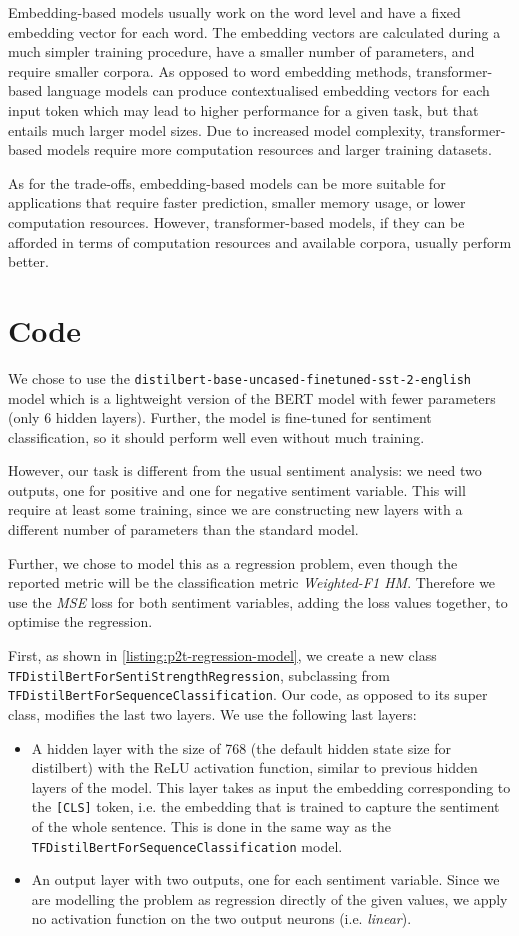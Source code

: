 Embedding-based models usually work on the word level and have a fixed embedding vector for each word. The embedding vectors are calculated during a much simpler training procedure, have a smaller number of parameters, and require smaller corpora.
As opposed to word embedding methods, transformer-based language models can produce contextualised embedding vectors for each input token which may lead to higher performance for a given task, but that entails much larger model sizes. Due to increased model complexity, transformer-based models require more computation resources and larger training datasets.

As for the trade-offs, embedding-based models can be more suitable for applications that require faster prediction, smaller memory usage, or lower computation resources. However, transformer-based models, if they can be afforded in terms of computation resources and available corpora, usually perform better.

\section{Code}

We chose to use the \texttt{distilbert-base-uncased-finetuned-sst-2-english} model which is a lightweight version of the BERT model with fewer parameters (only 6 hidden layers). Further, the model is fine-tuned for sentiment classification, so it should perform well even without much training.

However, our task is different from the usual sentiment analysis: we need two outputs, one for positive and one for negative sentiment variable. This will require at least some training, since we are constructing new layers with a different number of parameters than the standard model.

Further, we chose to model this as a regression problem, even though the reported metric will be the classification metric \textit{Weighted-F1 HM}. Therefore we use the \textit{MSE} loss for both sentiment variables, adding the loss values together, to optimise the regression.

First, as shown in \cref{listing:p2t-regression-model}, we create a new class \texttt{TFDistilBertForSentiStrengthRegression}, subclassing from \texttt{TFDistilBertForSequenceClassification}. Our code, as opposed to its super class, modifies the last two layers. We use the following last layers:
\begin{itemize}
    \item A hidden layer with the size of 768 (the default hidden state size for distilbert) with the ReLU activation function, similar to previous hidden layers of the model. This layer takes as input the embedding corresponding to the \texttt{[CLS]} token, i.e. the embedding that is trained to capture the sentiment of the whole sentence. This is done in the same way as the \texttt{TFDistilBertForSequenceClassification} model.
    \item An output layer with two outputs, one for each sentiment variable. Since we are modelling the problem as regression directly of the given values, we apply no activation function on the two output neurons (i.e. \textit{linear}).
\end{itemize}

